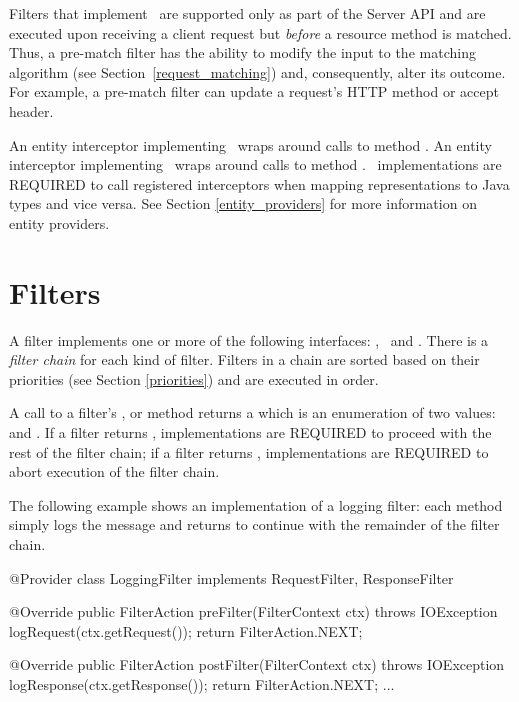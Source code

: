 Filters that implement \PreMatchRequestFilter\ are supported only as part of the Server API and are executed upon receiving a client request but {\em before} a resource method is matched. Thus, a pre-match filter has the ability to modify the input to the matching algorithm (see Section~\ref{request_matching}) and, consequently, alter its outcome. For example, a pre-match filter can update a request's HTTP method or accept header.

An entity interceptor implementing \ReaderInterceptor\ wraps around calls to  method . An entity interceptor implementing \WriterInterceptor\ wraps around calls to  method . \jaxrs\ implementations are REQUIRED to call registered interceptors when mapping representations to Java types and vice versa. See Section \ref{entity_providers} for more information on entity providers.

\section{Filters}
\label{filters}

A filter implements one or more of the following interfaces:  \RequestFilter, \PreMatchRequestFilter\ and \ResponseFilter. There is a \emph{filter chain} for each kind of filter. Filters in a chain are sorted based on their priorities (see Section \ref{priorities}) and are executed in order. 

A call to a filter's ,  or  method returns a  which is an enumeration of two values:  and . If a filter returns , implementations are REQUIRED to proceed with the rest of the filter chain; if a filter returns , implementations are REQUIRED to abort execution of the filter chain. 

The following example shows an implementation of a logging filter: each method simply logs the message and returns  to continue with the remainder of the filter chain.

\begin{listing}{1}
@Provider
class LoggingFilter implements RequestFilter, ResponseFilter {

    @Override
    public FilterAction preFilter(FilterContext ctx) throws IOException {
        logRequest(ctx.getRequest());
        return FilterAction.NEXT;
    }

    @Override
    public FilterAction postFilter(FilterContext ctx) throws IOException {
        logResponse(ctx.getResponse());
        return FilterAction.NEXT;
    }
    ...
}
\end{listing}

